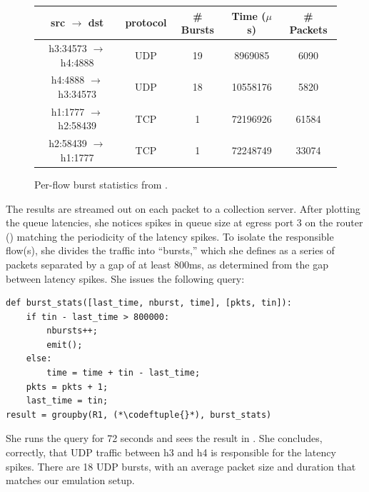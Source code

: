 \begin{figure}[t]
\vspace{0.083in}
\centering
\small
\begin{tabular}{c c c c c} \hline
\textbf{src $\rightarrow$ dst} & \textbf{protocol} & \textbf{\# Bursts} & \textbf{Time ($\mu$s)} & \textbf{\# Packets} \\ \hline \hline
h3:34573 $\rightarrow$ h4:4888 & UDP & 19 & 8969085 & 6090  \\ \hline
h4:4888 $\rightarrow$ h3:34573 & UDP & 18 & 10558176 & 5820 \\ \hline
h1:1777 $\rightarrow$ h2:58439 & TCP & 1 & 72196926 & 61584 \\ \hline
h2:58439 $\rightarrow$ h1:1777 & TCP & 1 & 72248749 & 33074 \\ \hline
\end{tabular}
\vspace{-0.1in}
\caption{Per-flow burst statistics from \TheSystem.}
\label{fig:mininet-flowstats}
\vspace{-0.1in}
\end{figure}

The results are streamed out on each packet to a collection server. After
plotting the queue latencies, she notices spikes in queue size at egress port 3
on the router () matching the periodicity of the latency
spikes. To isolate the responsible flow(s), she divides the traffic into
``bursts,'' which she defines as a series of packets separated by a gap of at
least 800ms, as determined from the gap between latency spikes. She issues the
following \TheSystem query:

\begin{small}
\begin{lstlisting}
def burst_stats([last_time, nburst, time], [pkts, tin]):
    if tin - last_time > 800000:
        nbursts++;
        emit();
    else:
        time = time + tin - last_time;
    pkts = pkts + 1;
    last_time = tin;
result = groupby(R1, (*\codeftuple{}*), burst_stats)
\end{lstlisting}
\end{small}

She runs the query for 72 seconds and sees the result in
. She concludes, correctly, that UDP traffic between
{\ct h3} and {\ct h4} is responsible for the latency spikes.  There are 18 UDP
bursts, with an average packet size and duration
that matches our emulation setup.

